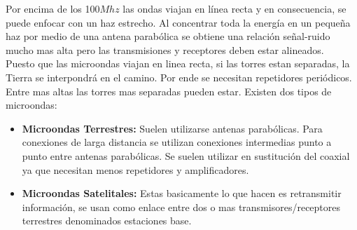 Por encima de los 100$Mhz$ las ondas viajan en línea recta y en consecuencia, se puede enfocar con un haz estrecho. Al concentrar toda la energía en un pequeña haz por medio de una antena parabólica se obtiene una relación señal-ruido mucho mas alta pero las transmisiones y receptores deben estar alineados. \\${ }$\\
Puesto que las microondas viajan en linea recta, si las torres estan separadas, la Tierra se interpondrá en el camino. Por ende se necesitan repetidores periódicos. Entre mas altas las torres mas separadas pueden estar. Existen dos tipos de microondas:
\begin{itemize}
\item \textbf{Microondas Terrestres:} Suelen utilizarse antenas parabólicas. Para conexiones de larga distancia se utilizan conexiones intermedias punto a punto entre antenas parabólicas. Se suelen utilizar en sustitución del coaxial ya que necesitan menos repetidores y amplificadores.
\item \textbf{Microondas Satelitales:} Estas basicamente lo que hacen es retransmitir información, se usan como enlace entre dos o mas transmisores/receptores terrestres denominados estaciones base.
\end{itemize}



